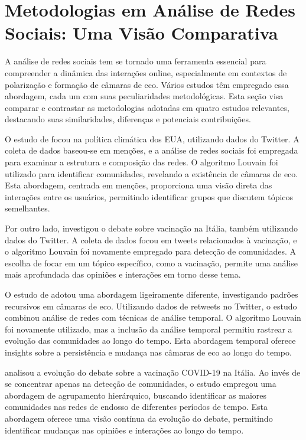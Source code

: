 \section{Metodologias em Análise de Redes Sociais: Uma Visão Comparativa}

A análise de redes sociais tem se tornado uma ferramenta essencial para compreender a dinâmica das interações online, especialmente em contextos de polarização e formação de câmaras de eco. Vários estudos têm empregado essa abordagem, cada um com suas peculiaridades metodológicas. Esta seção visa comparar e contrastar as metodologias adotadas em quatro estudos relevantes, destacando suas similaridades, diferenças e potenciais contribuições.

O estudo de  focou na política climática dos EUA, utilizando dados do Twitter. A coleta de dados baseou-se em menções, e a análise de redes sociais foi empregada para examinar a estrutura e composição das redes. O algoritmo Louvain foi utilizado para identificar comunidades, revelando a existência de câmaras de eco. Esta abordagem, centrada em menções, proporciona uma visão direta das interações entre os usuários, permitindo identificar grupos que discutem tópicos semelhantes.

Por outro lado,  investigou o debate sobre vacinação na Itália, também utilizando dados do Twitter. A coleta de dados focou em tweets relacionados à vacinação, e o algoritmo Louvain foi novamente empregado para detecção de comunidades. A escolha de focar em um tópico específico, como a vacinação, permite uma análise mais aprofundada das opiniões e interações em torno desse tema.

O estudo de  adotou uma abordagem ligeiramente diferente, investigando padrões recursivos em câmaras de eco. Utilizando dados de retweets no Twitter, o estudo combinou análise de redes com técnicas de análise temporal. O algoritmo Louvain foi novamente utilizado, mas a inclusão da análise temporal permitiu rastrear a evolução das comunidades ao longo do tempo. Esta abordagem temporal oferece insights sobre a persistência e mudança nas câmaras de eco ao longo do tempo.

 analisou a evolução do debate sobre a vacinação COVID-19 na Itália. Ao invés de se concentrar apenas na detecção de comunidades, o estudo empregou uma abordagem de agrupamento hierárquico, buscando identificar as maiores comunidades nas redes de endosso de diferentes períodos de tempo. Esta abordagem oferece uma visão contínua da evolução do debate, permitindo identificar mudanças nas opiniões e interações ao longo do tempo.

